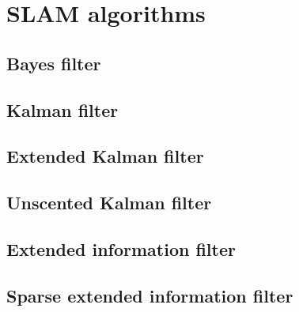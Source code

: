 \documentclass{article}
\begin{document}
\section{SLAM algorithms}

\subsection{Bayes filter}

\subsection{Kalman filter}

\subsection{Extended Kalman filter}

\subsection{Unscented Kalman filter}

\subsection{Extended information filter}

\subsection{Sparse extended information filter}

\printbibliography{}
\end{document}
